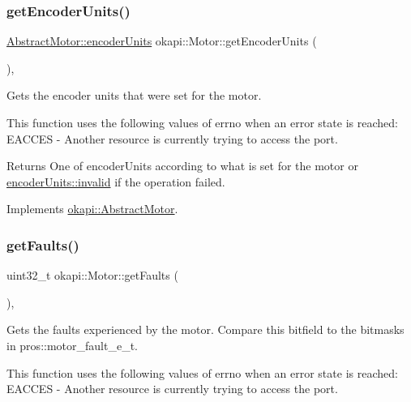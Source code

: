 \subsubsection{\texorpdfstring{getEncoderUnits()}{getEncoderUnits()}}
{\footnotesize\ttfamily \mbox{\hyperlink{classokapi_1_1AbstractMotor_ae811cd825099f2defadeb1b7f7e7764c}{Abstract\+Motor\+::encoder\+Units}} okapi\+::\+Motor\+::get\+Encoder\+Units (\begin{DoxyParamCaption}{ }\end{DoxyParamCaption})\hspace{0.3cm}{\ttfamily [override]}, {\ttfamily [virtual]}}

Gets the encoder units that were set for the motor.

This function uses the following values of errno when an error state is reached\+: E\+A\+C\+C\+ES -\/ Another resource is currently trying to access the port.

\begin{DoxyReturn}{Returns}
One of encoder\+Units according to what is set for the motor or \mbox{\hyperlink{classokapi_1_1AbstractMotor_ae811cd825099f2defadeb1b7f7e7764cafedb2d84cafe20862cb4399751a8a7e3}{encoder\+Units\+::invalid}} if the operation failed. 
\end{DoxyReturn}


Implements \mbox{\hyperlink{classokapi_1_1AbstractMotor_ae8225381a81ca0b54469949a6022b775}{okapi\+::\+Abstract\+Motor}}.

\mbox{\label{classokapi_1_1Motor_a7d16e9d0a3319a02a12476b5bec991d7}} 
\subsubsection{\texorpdfstring{getFaults()}{getFaults()}}
{\footnotesize\ttfamily uint32\+\_\+t okapi\+::\+Motor\+::get\+Faults (\begin{DoxyParamCaption}{ }\end{DoxyParamCaption})\hspace{0.3cm}{\ttfamily [override]}, {\ttfamily [virtual]}}

Gets the faults experienced by the motor. Compare this bitfield to the bitmasks in pros\+::motor\+\_\+fault\+\_\+e\+\_\+t.

This function uses the following values of errno when an error state is reached\+: E\+A\+C\+C\+ES -\/ Another resource is currently trying to access the port.

